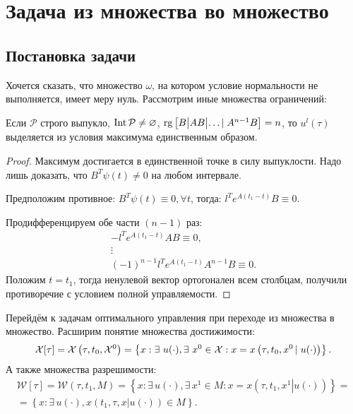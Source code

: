 \section{Задача из множества во множество}
\subsection{Постановка задачи}
Хочется сказать, что множество $\omega$, на котором условие нормальности не выполняется, имеет меру нуль.
Рассмотрим иные множества ограничений:
\begin{stm}
	Если $\mathcal P$ строго выпукло, $\operatorname{Int} \mathcal P\neq \varnothing$, $\operatorname{rg}\left[B\middle|AB\middle|\ldots\left|\right.A^{n-1}B\right]=n$, то $u^l(\tau)$ выделяется из условия максимума единственным образом.
\end{stm}

\begin{proof}
	Максимум достигается в единственной точке в силу выпуклости. Надо лишь доказать, что $B^T\psi(t)\neq 0$ на любом интервале.

	Предположим противное:
	$B^T\psi(t)\equiv 0, \forall t$, тогда:
	$l^Te^{A(t_1-t)}B\equiv 0.$

	Продифференцируем обе части $(n-1)$ раз:
	\begin{gather*}
		-l^{T}e^{A(t_1-t)}AB\equiv 0,\\
		\vdots\\
		(-1)^{n-1}l^T e^{A(t_1-t)}A^{n-1}B\equiv 0.
	\end{gather*}
	Положим $t = t_1$, тогда ненулевой вектор ортогонален всем столбцам, получили противоречие с условием полной управляемости. %
\end{proof}

Перейдём к задачам оптимального управления при переходе из множества в множество. Расширим понятие множества достижимости:
\begin{gather*}
	\soa[\tau] = \soa\left(\tau,t_0, \soa^0\right) = \left\{x: \exists\, u(\cdot), \exists\, x^0\in\soa:x = x\left(\tau, t_0, x^0\left|\right.u(\cdot)\right)\right\}.
\end{gather*}
А также множества разрешимости:
\begin{multline*}
	\mathcal{W}[\tau] = \mathcal{W}(\tau, t_1, M) = \left\{x:\exists\, u(\cdot),\exists\, x^1\in M:x = x\left(\tau, t_1, x^1\left|\right.u(\cdot)\right)\right\} ={}\\{}= \left\{x:\exists\, u(\cdot), x\left(t_1, \tau, x\left|\right.u(\cdot)\right)\in M\right\}.
\end{multline*}
